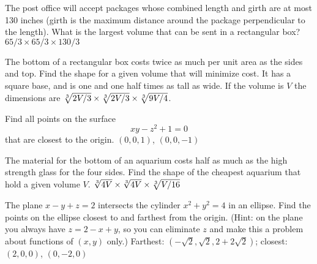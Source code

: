 \begin{multicols}{2}
\problem The post office will accept packages whose combined length and  
girth are at most 130 inches (girth is the maximum distance around the
package perpendicular to the length). What is the largest volume that can
be sent in a rectangular box? 
\answer  $65/3\times 65/3\times 130/3$  
\endanswer

\problem The bottom of a rectangular box costs twice as much per unit area  
as the sides and top. Find the shape for a given volume that will minimize
cost. 
\answer  It has a square base, and is one and one half times as tall  
as wide.  If the volume is $V$ the dimensions are $\root 3 \of {2V/3}\times
\root 3 \of {2V/3}\times \root 3\of {9V/4}$.
\endanswer


\problem Find all points on the surface  
$$xy-z^2+1=0$$
that are closest to the origin. 
\answer  $(0,0,1)$, $(0,0,-1)$  
\endanswer

\problem The material for the bottom of an aquarium costs half as much as  
the high strength glass for the four sides. Find the shape of the cheapest
aquarium that hold a given volume $V$. 
\answer  $\root 3\of{4V}\times\root  
3\of{4V}\times\root 3\of{V/16}$
\endanswer

\problem The plane $x-y+z=2$ intersects the cylinder $x^2+y^2=4$ in an  
ellipse. Find the points on the ellipse closest to and farthest from the
origin.  (Hint: on the plane you always have $z=2-x+y$, so you can
eliminate $z$ and make this a problem about functions of $(x,y)$ only.)
\answer  Farthest: $(-\sqrt2,\sqrt2,2+2\sqrt2)$; closest:  
$(2,0,0)$, $(0,-2,0)$
\endanswer
\end{multicols}
\noproblemfont



